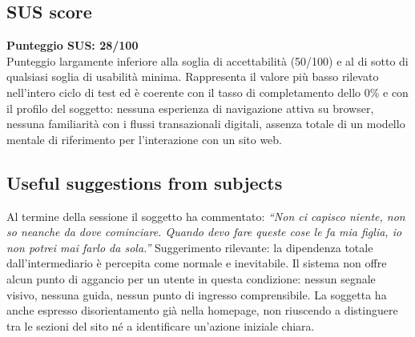 \documentclass[11pt,a4paper]{article}
\begin{document}
\subsection*{SUS score}
\begin{tcolorbox}[colback=backgroundColor,colframe=borderColor,arc=2mm]
\textbf{Punteggio SUS: 28/100}\\[0.2cm]
\small Punteggio largamente inferiore alla soglia di
accettabilità (50/100) e al di sotto di qualsiasi soglia
di usabilità minima. Rappresenta il valore più basso
rilevato nell'intero ciclo di test ed è coerente con il
tasso di completamento dello 0\% e con il profilo del
soggetto: nessuna esperienza di navigazione attiva su
browser, nessuna familiarità con i flussi transazionali
digitali, assenza totale di un modello mentale di
riferimento per l'interazione con un sito web.
\end{tcolorbox}

\subsection*{Useful suggestions from subjects}
\begin{tcolorbox}[colback=backgroundColor,colframe=borderColor,arc=2mm]
Al termine della sessione il soggetto ha commentato:
\textit{``Non ci capisco niente, non so neanche da dove
cominciare. Quando devo fare queste cose le fa mia figlia,
io non potrei mai farlo da sola.''}
Suggerimento rilevante: la dipendenza totale dall'intermediario
è percepita come normale e inevitabile. Il sistema non offre
alcun punto di aggancio per un utente in questa condizione:
nessun segnale visivo, nessuna guida, nessun punto di
ingresso comprensibile. La soggetta ha anche espresso
disorientamento già nella homepage, non riuscendo a
distinguere tra le sezioni del sito né a identificare
un'azione iniziale chiara.
\end{tcolorbox}
\end{document}
